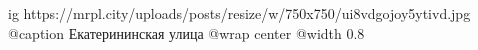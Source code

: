  
 
 
 
 

\ifcmt
  ig https://mrpl.city/uploads/posts/resize/w/750x750/ui8vdgojoy5ytivd.jpg
	@caption Екатерининская улица
  @wrap center
  @width 0.8
\fi
